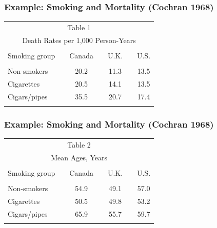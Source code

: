 \documentclass[xcolor=dvipsnames]{beamer}
\begin{document}
\begin{frame}
  \frametitle{Example: Smoking and Mortality (Cochran 1968)}
\begin{center}
 \begin{tabular}{lcccccc}
 \multicolumn{7}{c}{\small\sc Table 1}\\
 \multicolumn{7}{c}{\footnotesize\sc Death Rates per
 1,000 Person-Years}\vspace*{0.1cm}\\\hline\hline\\
 Smoking group&&Canada&&U.K.&&U.S.\\\hline\\
 Non-smokers&&20.2&&11.3&&13.5\\
 Cigarettes&&20.5&&14.1&&13.5\\
 Cigars/pipes&&35.5&&20.7&&17.4\\\hline\\
 \end{tabular}
\end{center}
\end{frame}

\begin{frame}
  \frametitle{Example: Smoking and Mortality (Cochran 1968)}
\begin{center}
 \begin{tabular}{lcccccc}
 \multicolumn{7}{c}{\small\sc Table 2}\\
 \multicolumn{7}{c}{\footnotesize\sc Mean Ages, Years}
 \vspace*{0.1cm}\\\hline\hline\\
 Smoking group&&Canada&&U.K.&&U.S.\\\hline\\
 Non-smokers&&54.9&&49.1&&57.0\\
 Cigarettes&&50.5&&49.8&&53.2\\
 Cigars/pipes&&65.9&&55.7&&59.7\\\hline\\
 \end{tabular}
\end{center}
\end{frame}
\end{document}
